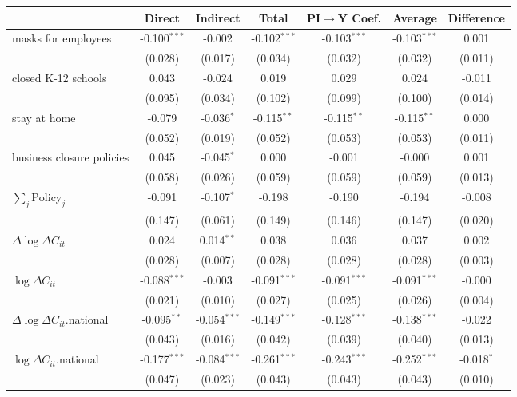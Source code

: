 
\begin{tabular}{lccccc|>{}c}
\toprule
  & Direct & Indirect & Total & PI$\to$Y Coef. & Average & Difference\\
\midrule
masks for employees & -0.100$^{***}$ & -0.002 & -0.102$^{***}$ & -0.103$^{***}$ & -0.103$^{***}$ & 0.001\\
 & (0.028) & (0.017) & (0.034) & (0.032) & (0.032) & (0.011)\\
closed K-12 schools & 0.043 & -0.024 & 0.019 & 0.029 & 0.024 & -0.011\\
 & (0.095) & (0.034) & (0.102) & (0.099) & (0.100) & (0.014)\\
stay at home & -0.079 & -0.036$^{*}$ & -0.115$^{**}$ & -0.115$^{**}$ & -0.115$^{**}$ & 0.000\\
 & (0.052) & (0.019) & (0.052) & (0.053) & (0.053) & (0.011)\\
business closure policies & 0.045 & -0.045$^{*}$ & 0.000 & -0.001 & -0.000 & 0.001\\
 & (0.058) & (0.026) & (0.059) & (0.059) & (0.059) & (0.013)\\
$\sum_j \mathrm{Policy}_j$ & -0.091 & -0.107$^{*}$ & -0.198 & -0.190 & -0.194 & -0.008\\
 & (0.147) & (0.061) & (0.149) & (0.146) & (0.147) & (0.020)\\
$\Delta \log \Delta C_{it}$ & 0.024 & 0.014$^{**}$ & 0.038 & 0.036 & 0.037 & 0.002\\
 & (0.028) & (0.007) & (0.028) & (0.028) & (0.028) & (0.003)\\
$\log \Delta C_{it}$ & -0.088$^{***}$ & -0.003 & -0.091$^{***}$ & -0.091$^{***}$ & -0.091$^{***}$ & -0.000\\
 & (0.021) & (0.010) & (0.027) & (0.025) & (0.026) & (0.004)\\
$\Delta \log \Delta C_{it}$.national & -0.095$^{**}$ & -0.054$^{***}$ & -0.149$^{***}$ & -0.128$^{***}$ & -0.138$^{***}$ & -0.022\\
 & (0.043) & (0.016) & (0.042) & (0.039) & (0.040) & (0.013)\\
$\log \Delta C_{it}$.national & -0.177$^{***}$ & -0.084$^{***}$ & -0.261$^{***}$ & -0.243$^{***}$ & -0.252$^{***}$ & -0.018$^{*}$\\
 & (0.047) & (0.023) & (0.043) & (0.043) & (0.043) & (0.010)\\
\bottomrule
\end{tabular}